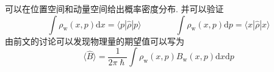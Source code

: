         可以在位置空间和动量空间给出概率密度分布. 并可以验证
        \begin{equation}
            \int \rho_\mathrm{w}(x,p) \mathrm{d}x = \langle p|\hat{\rho}|p \rangle
            \qquad\qquad
            \int \rho_\mathrm{w}(x,p) \mathrm{d}p = \langle x|\hat{\rho}|x \rangle
        \end{equation}
        由前文的讨论可以发现物理量的期望值可以写为
        \begin{equation}
            \langle \hat{B} \rangle = \frac 1{2\pi \hslash} \int \rho_\mathrm{w}(x,p) B_\mathrm{w}(x,p) \mathrm{d}x\mathrm{d}p
        \end{equation}

    
    